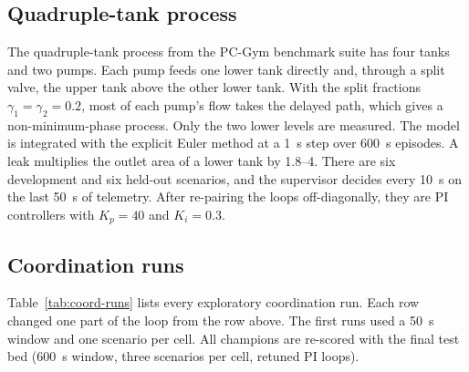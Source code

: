 \subsection{Quadruple-tank process}
The quadruple-tank process \cite{johansson2000} from the
PC-Gym benchmark suite \cite{bloor2024pcgym} has four tanks and two pumps.
Each pump feeds one lower tank directly and, through a split valve, the upper
tank above the other lower tank. With the split fractions
$\gamma_1 = \gamma_2 = 0.2$, most of each pump's flow takes the delayed path,
which gives a non-minimum-phase process. Only the two lower levels are
measured. The model is integrated with the explicit Euler method at a 1~s
step over 600~s episodes. A leak multiplies the outlet area of a lower tank
by 1.8--4. There are six development and six held-out scenarios, and the
supervisor decides every 10~s on the last 50~s of telemetry. After re-pairing
the loops off-diagonally, they are PI controllers with $K_p = 40$ and
$K_i = 0.3$.

\subsection{Coordination runs}
\label{sec:coord-runs}
Table~\ref{tab:coord-runs} lists every exploratory coordination run. Each row
changed one part of the loop from the row above. The first runs used a 50~s
window and one scenario per cell. All champions are re-scored with the
final test bed (600~s window, three scenarios per cell, retuned PI loops).


